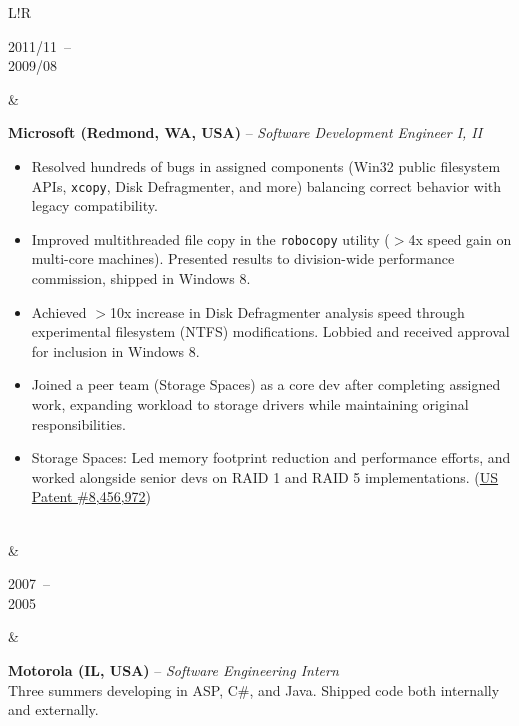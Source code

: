 \documentclass[10pt]{article}
\newcommand\VRule{\color{lightgray}\vrule width 0.5pt}
\def\spaceBetweenExperienceEntries{\vspace{8pt}&\vspace{8pt}\\}
\def\spaceBeforeExperienceBullets{\vspace{-10pt}}
\begin{document}
\begin{CJK}{UTF8}{gbsn}
\begin{tabular}{L!{\VRule}R}
    \parbox[t]{1.0\linewidth}{
        {\scriptsize 2011/11}~--\\
        {\scriptsize 2009/08}
    }&
    \parbox[t]{1.0\linewidth}{
        {\bf Microsoft (Redmond, WA, USA)} -- \textit{Software Development Engineer I, II}\\
        \spaceBeforeExperienceBullets
        \begin{itemize}[leftmargin=16pt]
            \item Resolved hundreds of bugs in assigned components (Win32 public filesystem APIs, \texttt{xcopy}, Disk Defragmenter, and more) balancing correct behavior with legacy compatibility.
            \item Improved multithreaded file copy in the \texttt{robocopy} utility ($>$4x speed gain on multi-core machines). Presented results to division-wide performance commission, shipped in Windows 8.
            \item Achieved $>$10x increase in Disk Defragmenter analysis speed through experimental filesystem (NTFS) modifications. Lobbied and received approval for inclusion in Windows 8.
            \item Joined a peer team (Storage Spaces) as a core dev after completing assigned work, expanding workload to storage drivers while maintaining original responsibilities.
            \item Storage Spaces: Led memory footprint reduction and performance efforts, and worked alongside senior devs on RAID 1 and RAID 5 implementations. (\href{http://www.google.com/patents/US8456972}{US Patent \#8,456,972})
        \end{itemize}
    }\\

    \spaceBetweenExperienceEntries

    \parbox[t]{1.0\linewidth}{
        {\scriptsize 2007}~--\\
        {\scriptsize 2005}
    }&
    \parbox[t]{1.0\linewidth}{
        {\bf Motorola (IL, USA)} -- \textit{Software Engineering Intern}\\
        Three summers developing in ASP, C\#, and Java. Shipped code both internally and externally.
    }\\
\end{tabular}


\end{CJK}
\end{document}
